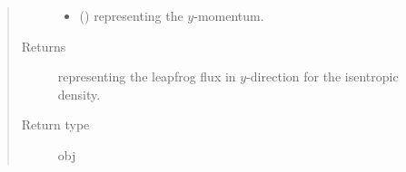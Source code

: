 \documentclass[letterpaper,10pt,english]{sphinxmanual}
\begin{document}
\begin{fulllineitems}
\begin{fulllineitems}
\begin{quote}
\begin{description}
\begin{itemize}
\item {} 
 () \textendash{}  representing the \(y\)-momentum.

\end{itemize}

\item[{Returns}] \leavevmode
{} representing the leapfrog flux in \(y\)-direction for the isentropic density.

\item[{Return type}] \leavevmode
obj

\end{description}\end{quote}

\end{fulllineitems}


\end{fulllineitems}

\end{document}
